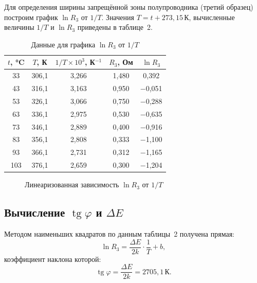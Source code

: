 \documentclass[a4paper,14pt]{extarticle}
\begin{document}
Для определения ширины запрещённой зоны полупроводника (третий образец) построим
график $\ln R_3$ от $1/T$. Значения $T = t + 273{,}15\,\text{К}$, вычисленные
величины $1/T$ и $\ln R_3$ приведены в таблице~2.

\begin{table}[h]
\centering
\caption{Данные для графика $\ln R_3$ от $1/T$}
\begin{tabular}{|c|c|c|c|c|}
\hline
$t$, °C & $T$, К & $1/T \times 10^{3}$, К$^{-1}$ & $R_3$, Ом & $\ln R_3$ \\
\hline
33  & 306,1 & 3,266 & 1,480 &  0,392 \\
43  & 316,1 & 3,163 & 0,950 & $-$0,051 \\
53  & 326,1 & 3,066 & 0,750 & $-$0,288 \\
63  & 336,1 & 2,975 & 0,530 & $-$0,635 \\
73  & 346,1 & 2,889 & 0,400 & $-$0,916 \\
83  & 356,1 & 2,808 & 0,333 & $-$1,100 \\
93  & 366,1 & 2,731 & 0,312 & $-$1,165 \\
103 & 376,1 & 2,659 & 0,300 & $-$1,204 \\
\hline
\end{tabular}
\end{table}

\begin{figure}[h]
\centering
{}
\caption{Линеаризованная зависимость $\ln R_3$ от $1/T$}
\end{figure}

\subsection*{Вычисление $\operatorname{tg}\varphi$ и $\Delta E$}

Методом наименьших квадратов по данным таблицы~2 получена прямая:
\[
\ln R_3 = \frac{\Delta E}{2k} \cdot \frac{1}{T} + b,
\]
коэффициент наклона которой:
\[
\operatorname{tg}\varphi = \frac{\Delta E}{2k} = 2705{,}1\,\text{К}.
\]
\end{document}
